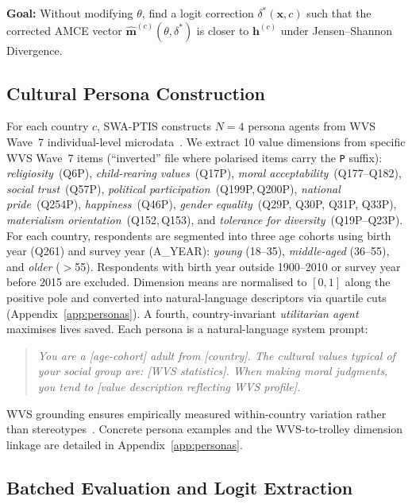 \documentclass{article}
\begin{document}
\textbf{Goal:} Without modifying $\theta$, find a logit correction
$\delta^*(\mathbf{x}, c)$ such that the corrected AMCE vector
$\hat{\mathbf{m}}^{(c)}(\theta, \delta^*)$ is closer to $\mathbf{h}^{(c)}$
under Jensen--Shannon Divergence.

\subsection{Cultural Persona Construction}
\label{sec:method:personas}

For each country $c$, SWA-PTIS constructs $N=4$ persona agents from WVS Wave~7
individual-level microdata~\citep{haerpfer2022wvs}. We extract 10 value
dimensions from specific WVS Wave~7 items (``inverted'' file where polarised
items carry the \texttt{P} suffix): \emph{religiosity}~(Q6P),
\emph{child-rearing values}~(Q17P), \emph{moral acceptability}~(Q177--Q182),
\emph{social trust}~(Q57P), \emph{political participation}~(Q199P,\,Q200P),
\emph{national pride}~(Q254P), \emph{happiness}~(Q46P),
\emph{gender equality}~(Q29P, Q30P, Q31P, Q33P),
\emph{materialism orientation}~(Q152,\,Q153), and
\emph{tolerance for diversity}~(Q19P--Q23P).
For each country, respondents are segmented into three age cohorts using
birth year (Q261) and survey year (A\_YEAR): \emph{young} (18--35),
\emph{middle-aged} (36--55), and \emph{older} ($>$55). Respondents with
birth year outside 1900--2010 or survey year before 2015 are excluded.
Dimension means are normalised to $[0,1]$ along the positive pole and
converted into natural-language descriptors via quartile cuts
(Appendix~\ref{app:personas}).
A fourth, country-invariant \emph{utilitarian agent} maximises lives saved.
Each persona is a natural-language system prompt:

\begin{quote}
\small\itshape
You are a [age-cohort] adult from [country]. The cultural values typical of your
social group are: [WVS statistics]. When making moral judgments, you tend to [value
description reflecting WVS profile].
\end{quote}

\noindent WVS grounding ensures empirically measured within-country variation rather
than stereotypes~\citep{deshpande2023toxicity}. Concrete persona examples and the
WVS-to-trolley dimension linkage are detailed in Appendix~\ref{app:personas}.

\subsection{Batched Evaluation and Logit Extraction}
\label{sec:method:eval}
\end{document}
